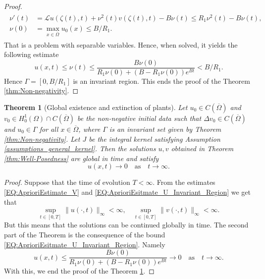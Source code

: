 \documentclass[12pt, a4paper]{article}
\theoremstyle{break}
\newtheorem{thm}{Theorem}[section]
\theoremstyle{break}
\theoremstyle{break}
\theoremstyle{break}
\theoremstyle{break}
\theoremstyle{break}
\theoremstyle{break}
\begin{document}
\begin{proof}
\begin{align}
\begin{split}
            \nu'(t) &= \mathcal{L} u(\zeta(t), t) + \nu^2(t) v(\zeta(t), t) - B \nu(t) \leq R_1 \nu^2(t) - B \nu(t), \\
            \nu(0) &= \max_{x \in \overline{\Omega}} u_0(x) \leq B/R_1.
        \end{split}
    \end{align}
    That is a problem with separable variables. Hence, when solved, it yields the following estimate
    \begin{equation}
        \label{EQ:AprioriEsitmate_U_Invariant_Region}
        u(x,t) \leq \nu(t) \leq \frac{B\nu(0)}{R_1 \nu(0) + 
        (B - R_1 \nu(0)) e^{B t}} < B / R_1.
    \end{equation}
    Hence $\Gamma = [0, B/R_1]$ is an invariant region. This ends the proof of the Theorem \ref{thm:Non-negativity}.
\end{proof}
\begin{thm}[Global existence and extinction of plants]
    \label{thm:Global-Existence}
     Let $u_0 \in C(\overline{\Omega})$ and $v_0 \in H^1_0(\Omega)\cap C(\overline{\Omega})$ be the non-negative initial data such that $\Delta v_0 \in C(\overline{\Omega})$ and $u_0 \in \Gamma$ for all $x \in \overline{\Omega}$, where $\Gamma$ is an invariant set given by Theorem \ref{thm:Non-negativity}. Let $J$ be the integral kernel satisfying Assumption \ref{assumptions_general_kernel}. Then the solutions $u, v$ obtained in Theorem \ref{thm:Well-Posedness} are global in time and satisfy
     \begin{equation*}
         u(x,t) \rightarrow 0 \quad \text{as} \quad t \rightarrow \infty.
     \end{equation*}
\end{thm}
\begin{proof}
    Suppose that the time of evolution $T < \infty$. From the estimates \eqref{EQ:AprioriEstimate_V} and \eqref{EQ:AprioriEsitmate_U_Invariant_Region} we get that
    \begin{equation*}
        \sup_{t \in [0, T]} \|u(\cdot, t)\|_\infty < \infty, \quad
        \sup_{t \in [0, T]} \|v(\cdot, t)\|_\infty < \infty.
    \end{equation*}
    But this means that the solutions can be continued globally in time. The second part of the Theorem is the consequence of the bound \eqref{EQ:AprioriEsitmate_U_Invariant_Region}. Namely
    \begin{equation*}
        u(x,t) \leq \frac{B\nu(0)}{R_1 \nu(0) + 
        (B - R_1 \nu(0)) e^{B t}} \rightarrow 0 \quad \text{as} \quad t \rightarrow \infty.
    \end{equation*}
    With this, we end the proof of the Theorem \ref{thm:Global-Existence}.
\end{proof}
\end{document}
